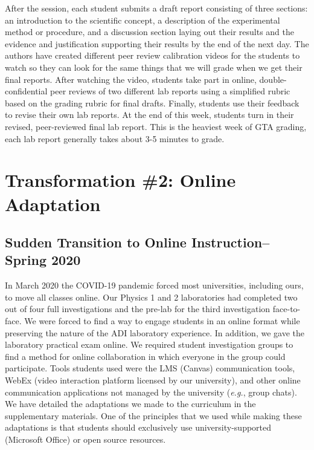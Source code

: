 \documentclass[aip, numerical, preprint]{revtex4-2}
\begin{document}
After the session, each student submits a draft report consisting of three sections: an
introduction to the scientific concept, a description of the experimental method or procedure,
and a discussion section laying out their results and the evidence and justification supporting
their results by the end of the next day.  The authors have created different peer review
calibration videos for the students to watch so they can look for the same things that we will
grade when we get their final reports.  After watching the video, students take part in online,
double-confidential peer reviews of two different lab reports using a simplified rubric based
on the grading rubric for final drafts.  Finally, students use their feedback to revise their
own lab reports.  At the end of this week, students turn in their revised, peer-reviewed final
lab report.  This is the heaviest week of GTA grading, each lab report generally takes about
3-5 minutes to grade.

\section{Transformation \#2: Online Adaptation}

\subsection{Sudden Transition to Online Instruction--Spring 2020}

In March 2020 the COVID-19 pandemic forced most universities, including ours, to move all
classes online. Our Physics 1 and 2 laboratories had completed two out of four full
investigations and the pre-lab for the third investigation face-to-face. We were forced to find
a way to engage students in an online format while preserving the nature of the ADI laboratory
experience. In addition, we gave the laboratory practical exam online. We required student
investigation groups to find a method for online collaboration in which everyone in the group
could participate. Tools students used were the LMS (Canvas) communication tools, WebEx (video
interaction platform licensed by our university), and other online communication applications
not managed by the university (\emph{e.g.}, group chats). We have detailed the adaptations we
made to the curriculum in the supplementary materials.  One of the principles that we used
while making these adaptations is that students should exclusively use university-supported
(Microsoft Office) or open source resources.
\end{document}
